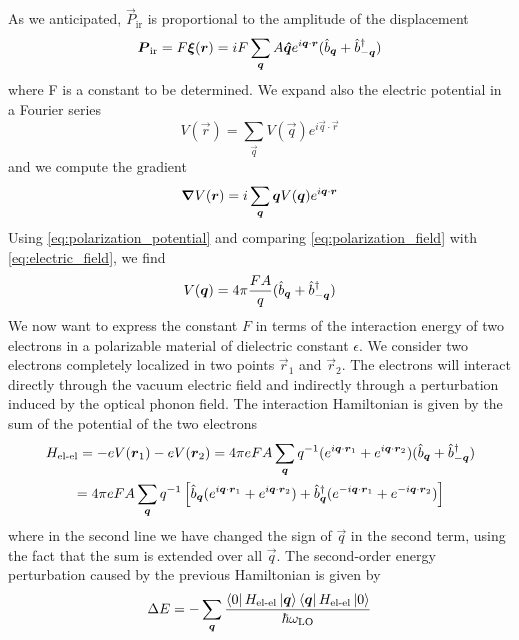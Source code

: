 As we anticipated, $\vec{P}_\text{ir}$ is proportional to the amplitude of the displacement
\begin{equation} \label{eq:polarization_field}
    \mathbf{\boldsymbol{P}}_\text{ir} = F \mathbf{\boldsymbol{\xi}}(\mathbf{\boldsymbol{r}}) = i F \sum_{\mathbf{\boldsymbol{q}}} A \mathbf{\boldsymbol{\hat{q}}} e^{i\mathbf{\boldsymbol{q}} \cdot \mathbf{\boldsymbol{r}}} (\hat{b}_{\mathbf{\boldsymbol{q}}} + \hat{b}^\dagger_{-\mathbf{\boldsymbol{q}}})
\end{equation}
where F is a constant to be determined. We expand also the electric potential in a Fourier series
\begin{equation}
    V(\vec{r}) = \sum_\vec{q} V(\vec{q}) e^{i\vec{q} \cdot \vec{r}}
\end{equation}
and we compute the gradient
\begin{equation} \label{eq:electric_field}
    \grad V(\mathbf{\boldsymbol{r}}) = i \sum_{\mathbf{\boldsymbol{q}}} \mathbf{\boldsymbol{q}} V(\mathbf{\boldsymbol{q}}) e^{i\mathbf{\boldsymbol{q}} \cdot \mathbf{\boldsymbol{r}}}
\end{equation}
Using \cref{eq:polarization_potential} and comparing \cref{eq:polarization_field} with \cref{eq:electric_field}, we find
\begin{equation}
    V(\mathbf{\boldsymbol{q}}) = 4\pi \frac{F A}{q} (\hat{b}_{\mathbf{\boldsymbol{q}}} + \hat{b}^\dagger_{-\mathbf{\boldsymbol{q}}})
\end{equation}
We now want to express the constant $F$ in terms of the interaction energy of two electrons in a polarizable material of dielectric constant $\epsilon$. We consider two electrons completely localized in two points $\vec{r}_1$ and $\vec{r}_2$. The electrons will interact directly through the vacuum electric field and indirectly through a perturbation induced by the optical phonon field. The interaction Hamiltonian is given by the sum of the potential of the two electrons
\begin{multline} \label{eq:hamiltonian_coulomb_medium}
    H_\text{el-el} = -e V(\mathbf{\boldsymbol{r}}_1) -e V(\mathbf{\boldsymbol{r}}_2)
    = 4\pi e F A \sum_{\mathbf{\boldsymbol{q}}} q^{-1} (e^{i\mathbf{\boldsymbol{q}} \cdot \mathbf{\boldsymbol{r}}_1} + e^{i\mathbf{\boldsymbol{q}} \cdot \mathbf{\boldsymbol{r}}_2} ) (\hat{b}_{\mathbf{\boldsymbol{q}}} + \hat{b}^\dagger_{-\mathbf{\boldsymbol{q}}})
    \\ = 4\pi e F A \sum_{\mathbf{\boldsymbol{q}}} q^{-1} \left[ \hat{b}_{\mathbf{\boldsymbol{q}}} (e^{i\mathbf{\boldsymbol{q}} \cdot \mathbf{\boldsymbol{r}}_1} + e^{i\mathbf{\boldsymbol{q}} \cdot \mathbf{\boldsymbol{r}}_2} )   + \hat{b}^\dagger_{\mathbf{\boldsymbol{q}}} (e^{-i\mathbf{\boldsymbol{q}} \cdot \mathbf{\boldsymbol{r}}_1} + e^{-i\mathbf{\boldsymbol{q}} \cdot \mathbf{\boldsymbol{r}}_2} )\right]
\end{multline}
where in the second line we have changed the sign of $\vec{q}$ in the second term, using the fact that the sum is extended over all $\vec{q}$. The second-order energy perturbation caused by the previous Hamiltonian is given by
\begin{equation}
    \Delta E = -\sum_{\mathbf{\boldsymbol{q}}} \frac{\bra{0}H_\text{el-el}\ket{\mathbf{\boldsymbol{q}}}\bra{\mathbf{\boldsymbol{q}}}H_\text{el-el}\ket{0}}{\hbar\omega_\text{LO}}
\end{equation}
